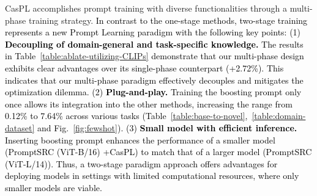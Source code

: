 \documentclass[runningheads]{llncs}
\newcommand{\rewrite}[1]{\textcolor{black}{#1}}%
\begin{document}
{{
CasPL accomplishes prompt training with diverse functionalities through a multi-phase training strategy.
\rewrite{In contrast to the one-stage methods, two-stage training represents a new Prompt Learning paradigm with the following key points: (1) \textbf{Decoupling of domain-general and task-specific knowledge.} The results in Table~\ref{table:ablate-utilizing-CLIPs} demonstrate that our multi-phase design exhibits clear advantages over its single-phase counterpart (+2.72\%). This indicates that our multi-phase paradigm effectively decouples and mitigates the optimization dilemma.
(2) \textbf{Plug-and-play.} Training the boosting prompt only once allows its integration into the other methods, increasing the range from 0.12\% to 7.64\% across various tasks (Table~\ref{table:base-to-novel},~\ref{table:domain-dataset} and Fig.~\ref{fig:fewshot}). 
(3) \textbf{Small model with efficient inference.} Inserting boosting prompt enhances the performance of a smaller model (PromptSRC (ViT-B/16) +CasPL) to match that of a larger model (PromptSRC (ViT-L/14)). Thus, a two-stage paradigm approach offers advantages for deploying models in settings with limited computational resources, where only smaller models are viable.}


}}
\end{document}
